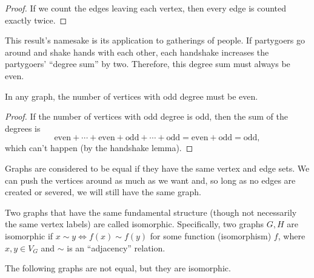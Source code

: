 \documentclass[../m55main.tex]{chapters}
\begin{document}
\begin{proof}
    If we count the edges leaving each vertex, then every edge is counted exactly twice. 
\end{proof}

This result's namesake is its application to gatherings of people.
If partygoers go around and shake hands with each other, each handshake increases the partygoers' ``degree sum'' by two.
Therefore, this degree sum must always be even.

\begin{corollary}[Oddballs]
    In any graph, the number of vertices with odd degree must be even.
\end{corollary}

\begin{proof}
    If the number of vertices with odd degree is odd, then the sum of the degrees is
    \[ \text{even} + \cdots + \text{even} + \text{odd} + \cdots + \text{odd} = \text{even} + \text{odd} = \text{odd}, \]
    which can't happen (by the handshake lemma).
\end{proof}

Graphs are considered to be equal if they have the same vertex and edge sets.
We can push the vertices around as much as we want and, so long as no edges are created or severed, we will still have the same graph.

Two graphs that have the same fundamental structure (though not necessarily the same vertex labels) are called isomorphic.
Specifically, two graphs $G,H$ are isomorphic if $x \sim y \iff f(x) \sim f(y)$ for some function (isomorphism) $f$, where $x,y \in V_G$ and $\sim$ is an ``adjacency'' relation.

The following graphs are not equal, but they are isomorphic.

\medskip
\begin{center}
\end{center}
\end{document}
